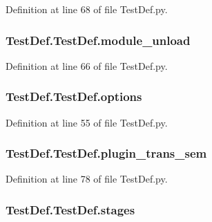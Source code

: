 Definition at line 68 of file Test\-Def.\-py.

\hypertarget{class_test_def_1_1_test_def_aba7b969431e50773d10f1384ae2149ab}{
\subsubsection[{module\-\_\-unload}]{\setlength{\rightskip}{0pt plus 5cm}Test\-Def.\-Test\-Def.\-module\-\_\-unload}}\label{class_test_def_1_1_test_def_aba7b969431e50773d10f1384ae2149ab}


Definition at line 66 of file Test\-Def.\-py.

\hypertarget{class_test_def_1_1_test_def_a7c7d587995154a9f31607dc4726d3a2a}{
\subsubsection[{options}]{\setlength{\rightskip}{0pt plus 5cm}Test\-Def.\-Test\-Def.\-options}}\label{class_test_def_1_1_test_def_a7c7d587995154a9f31607dc4726d3a2a}


Definition at line 55 of file Test\-Def.\-py.

\hypertarget{class_test_def_1_1_test_def_ac4a745e8b2151d1eed56e04770562eb9}{
\subsubsection[{plugin\-\_\-trans\-\_\-sem}]{\setlength{\rightskip}{0pt plus 5cm}Test\-Def.\-Test\-Def.\-plugin\-\_\-trans\-\_\-sem}}\label{class_test_def_1_1_test_def_ac4a745e8b2151d1eed56e04770562eb9}


Definition at line 78 of file Test\-Def.\-py.

\hypertarget{class_test_def_1_1_test_def_a9e15c13bd0cc9b1567c94f847118432e}{
\subsubsection[{stages}]{\setlength{\rightskip}{0pt plus 5cm}Test\-Def.\-Test\-Def.\-stages}}\label{class_test_def_1_1_test_def_a9e15c13bd0cc9b1567c94f847118432e}



